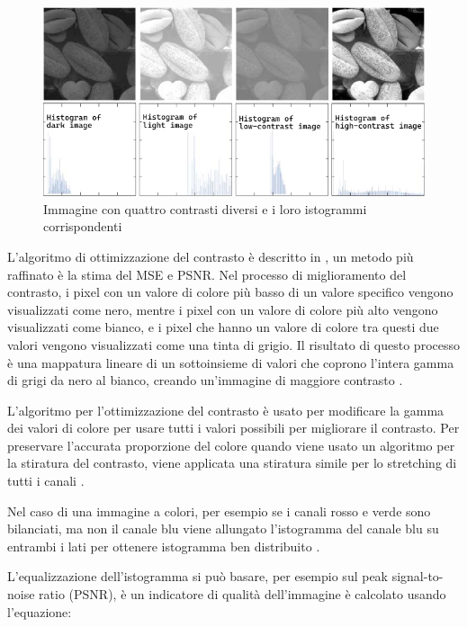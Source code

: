\begin{figure}[ht]
    \centering
    \includegraphics[width=1\textwidth]{preprocessing/histogram-contrast.pdf}
    \caption{Immagine con quattro contrasti diversi e i loro istogrammi corrispondenti}
    \label{fig:histogram-contrast}
\end{figure}

L'algoritmo di ottimizzazione del contrasto è descritto in \cite{gonzalez_dip}, un metodo più raffinato è la stima del MSE e PSNR. Nel processo di miglioramento del contrasto, i pixel con
un valore di colore più basso di un valore specifico vengono visualizzati come
nero, mentre i pixel con un valore di colore più alto vengono
visualizzati come bianco, e i pixel che hanno un valore di colore tra questi due valori vengono visualizzati come una tinta di grigio.
Il risultato di questo processo è una mappatura lineare di un
sottoinsieme di valori che coprono l'intera gamma di grigi da
nero al bianco, creando un'immagine di maggiore contrasto \cite{sunaryo_preprocessing}. 

L'algoritmo per l'ottimizzazione del contrasto è usato per modificare
la gamma dei valori di colore per usare tutti i valori possibili per
migliorare il contrasto. Per preservare l'accurata proporzione del colore
quando viene usato un algoritmo per la  stiratura del contrasto,
viene applicata una stiratura simile per lo stretching di tutti i canali \cite{sunaryo_preprocessing}. 

Nel caso di una immagine a colori, per esempio se i canali rosso e verde sono bilanciati, ma non il canale blu viene allungato l'istogramma del canale blu su entrambi i lati per ottenere
istogramma ben distribuito \cite{sunaryo_preprocessing}.

L'equalizzazione dell'istogramma si può basare, per esempio sul peak signal-to-noise ratio (PSNR), è un indicatore di qualità dell'immagine è calcolato usando l'equazione:

